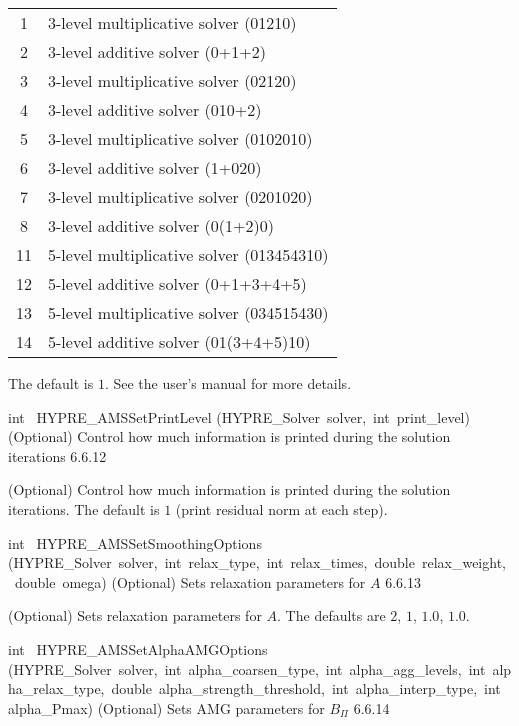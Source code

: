 \documentclass{article}
\begin{document}
\begin{cxxentry}
\begin{cxxentry}
\begin{cxxfunction}
\begin{cxxdoc}
\begin{tabular}{|c|l|}
\hline
1 & 3-level multiplicative solver (01210) \\
2 & 3-level additive solver (0+1+2) \\
3 & 3-level multiplicative solver (02120) \\
4 & 3-level additive solver (010+2) \\
5 & 3-level multiplicative solver (0102010) \\
6 & 3-level additive solver (1+020) \\
7 & 3-level multiplicative solver (0201020) \\
8 & 3-level additive solver (0(1+2)0) \\
11 & 5-level multiplicative solver (013454310) \\
12 & 5-level additive solver (0+1+3+4+5) \\
13 & 5-level multiplicative solver (034515430) \\
14 & 5-level additive solver (01(3+4+5)10) \\
\hline
\end{tabular}

The default is $1$. See the user's manual for more details.
\end{cxxdoc}
\end{cxxfunction}
\begin{cxxfunction}
{int\ }
        {HYPRE\_AMSSetPrintLevel}
        {(HYPRE\_Solver\ solver,\ int\ print\_level)}
        {
(Optional) Control how much information is printed during the
solution iterations}
        {6.6.12}
\begin{cxxdoc}

(Optional) Control how much information is printed during the
solution iterations.
The default is $1$ (print residual norm at each step).
\end{cxxdoc}
\end{cxxfunction}
\begin{cxxfunction}
{int\ }
        {HYPRE\_AMSSetSmoothingOptions}
        {(HYPRE\_Solver\ solver,\ int\ relax\_type,\ int\ relax\_times,\ double\ relax\_weight,\ double\ omega)}
        {
(Optional) Sets relaxation parameters for $A$}
        {6.6.13}
\begin{cxxdoc}

(Optional) Sets relaxation parameters for $A$.
The defaults are $2$, $1$, $1.0$, $1.0$.
\end{cxxdoc}
\end{cxxfunction}
\begin{cxxfunction}
{int\ }
        {HYPRE\_AMSSetAlphaAMGOptions}
        {(HYPRE\_Solver\ solver,\ int\ alpha\_coarsen\_type,\ int\ alpha\_agg\_levels,\ int\ alpha\_relax\_type,\ double\ alpha\_strength\_threshold,\ int\ alpha\_interp\_type,\ int\ alpha\_Pmax)}
        {
(Optional) Sets AMG parameters for $B_\Pi$}
        {6.6.14}
\begin{cxxdoc}


\end{cxxdoc}
\end{cxxfunction}
\end{cxxentry}
\end{cxxentry}
\end{document}
